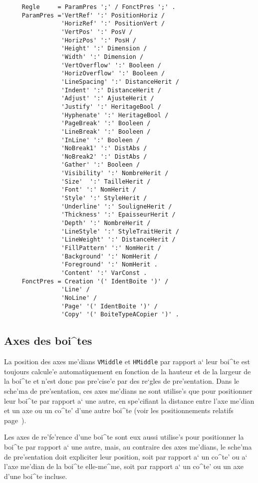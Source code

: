{\begin{verbatim}
     Regle     = ParamPres ';' / FonctPres ';' .
     ParamPres ='VertRef' ':' PositionHoriz /
                'HorizRef' ':' PositionVert /
                'VertPos' ':' PosV /
                'HorizPos' ':' PosH /
                'Height' ':' Dimension /
                'Width' ':' Dimension /
                'VertOverflow' ':' Booleen /
                'HorizOverflow' ':' Booleen /
                'LineSpacing' ':' DistanceHerit /
                'Indent' ':' DistanceHerit /
                'Adjust' ':' AjusteHerit /
                'Justify' ':' HeritageBool /
                'Hyphenate' ':' HeritageBool /
                'PageBreak' ':' Booleen /
                'LineBreak' ':' Booleen /
                'InLine' ':' Booleen /
                'NoBreak1' ':' DistAbs /
                'NoBreak2' ':' DistAbs /
                'Gather' ':' Booleen /
                'Visibility' ':' NombreHerit /
                'Size'  ':' TailleHerit /
                'Font' ':' NomHerit /
                'Style' ':' StyleHerit /
                'Underline' ':' SouligneHerit /
                'Thickness' ':' EpaisseurHerit /
                'Depth' ':' NombreHerit /
                'LineStyle' ':' StyleTraitHerit /
                'LineWeight' ':' DistanceHerit /
                'FillPattern' ':' NomHerit /
                'Background' ':' NomHerit /
                'Foreground' ':' NomHerit .
                'Content' ':' VarConst .
     FonctPres = Creation '(' IdentBoite ')' /
                'Line' /
                'NoLine' /
                'Page' '(' IdentBoite ')' /
                'Copy' '(' BoiteTypeACopier ')' .
\end{verbatim}

\subsection{Axes des boi^tes}

La position des axes me'dians {\tt VMiddle} et {\tt HMiddle} par rapport a`
leur boi^te est toujours calcule'e automatiquement en fonction de la hauteur
et de la largeur de la boi^te et n'est donc pas pre'cise'e
par des re`gles de pre'sentation. Dans le sche'ma de pre'sentation, ces axes
me'dians ne sont utilise's que pour positionner leur boi^te par
rapport a` une autre, en spe'cifiant la distance entre l'axe me'dian et
un axe ou un co^te' d'une autre boi^te (voir les positionnements relatifs
page~\pageref{position}).

Les axes de re'fe'rence d'une boi^te sont eux aussi utilise's
pour positionner la boi^te par rapport a` une autre, mais, au contraire
des axes me'dians, le sche'ma de pre'sentation doit expliciter leur position,
soit par rapport a` un co^te' ou a` l'axe me'dian de la boi^te elle-me^me,
soit par rapport a` un co^te' ou un axe d'une boi^te incluse.

}
